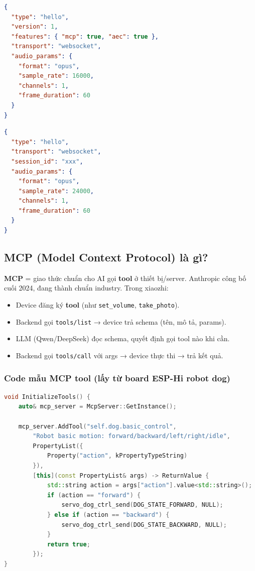 \documentclass[11pt,a4paper]{article}
\begin{document}
\begin{lstlisting}[language=json, caption={Hello message device gửi}]
{
  "type": "hello",
  "version": 1,
  "features": { "mcp": true, "aec": true },
  "transport": "websocket",
  "audio_params": {
    "format": "opus",
    "sample_rate": 16000,
    "channels": 1,
    "frame_duration": 60
  }
}
\end{lstlisting}

\begin{lstlisting}[language=json, caption={Hello reply server gửi về}]
{
  "type": "hello",
  "transport": "websocket",
  "session_id": "xxx",
  "audio_params": {
    "format": "opus",
    "sample_rate": 24000,
    "channels": 1,
    "frame_duration": 60
  }
}
\end{lstlisting}

\subsection{MCP (Model Context Protocol) là gì?}
\textbf{MCP} = giao thức chuẩn cho AI gọi \textbf{tool} ở thiết bị/server. Anthropic công bố cuối 2024, đang thành chuẩn industry. Trong xiaozhi:
\begin{itemize}
  \item Device đăng ký \textbf{tool} (như \texttt{set\_volume}, \texttt{take\_photo}).
  \item Backend gọi \texttt{tools/list} → device trả schema (tên, mô tả, params).
  \item LLM (Qwen/DeepSeek) đọc schema, quyết định gọi tool nào khi cần.
  \item Backend gọi \texttt{tools/call} với args → device thực thi → trả kết quả.
\end{itemize}

\subsubsection*{Code mẫu MCP tool (lấy từ board ESP-Hi robot dog)}
\begin{lstlisting}[language=C++, caption={InitializeTools() trong main/boards/esp-hi/esp\_hi.cc}]
void InitializeTools() {
    auto& mcp_server = McpServer::GetInstance();

    mcp_server.AddTool("self.dog.basic_control",
        "Robot basic motion: forward/backward/left/right/idle",
        PropertyList({
            Property("action", kPropertyTypeString)
        }),
        [this](const PropertyList& args) -> ReturnValue {
            std::string action = args["action"].value<std::string>();
            if (action == "forward") {
                servo_dog_ctrl_send(DOG_STATE_FORWARD, NULL);
            } else if (action == "backward") {
                servo_dog_ctrl_send(DOG_STATE_BACKWARD, NULL);
            }
            return true;
        });
}
\end{lstlisting}
\end{document}
